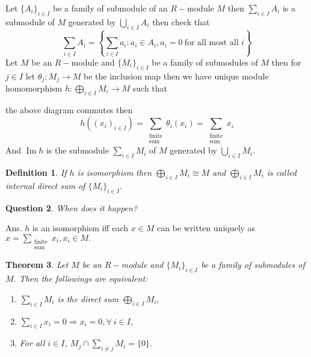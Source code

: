 \documentclass[11pt]{amsart}
\newtheorem{theorem}{Theorem}[section]
\newtheorem{defn}[theorem]{Definition}
\newtheorem{qns}[theorem]{Question}
\DeclareMathOperator{\im}{\text{Im}}
\begin{document}
 Let $\{A_i\}_{i\in I}$ be a family of submodule of an $R-$module $M$ then $\displaystyle\sum_{i\in I} A_i$ is a submodule of $M$ generated by $\displaystyle\bigcup_{i\in I} A_i$ then check that $$\displaystyle\sum_{i\in I} A_i=\left\lbrace\displaystyle\sum_{i\in I} a_i:a_i\in A_i,a_i=0~\text{for all most all~}i\right\rbrace$$
Let $M$ be an $R-$module and $\{M_i\}_{i\in I}$ be a family of submodules of $M$ then for $j\in I$ let $\theta_j:M_j\to M$ be the inclusion map then we have unique module homomorphism $h:\displaystyle\bigoplus_{i\in I} M_i\to M$ such that \begin{center}
\end{center}
the above diagram commutes then $$h((x_i)_{i\in I})=\displaystyle\sum_{\substack{\text{finite}\\ \text{sum}}} \theta_i(x_i)=\displaystyle\sum_{\substack{\text{finite}\\ \text{sum}}} x_i$$
And $\im h$ is the submodule $\displaystyle\sum_{i\in I} M_i$ of $M$ generated by $\displaystyle\bigcup_{i\in I} M_i.$
\begin{defn}
If $h$ is isomorphism then $\displaystyle\bigoplus_{i\in I} M_i \cong M$ and $\displaystyle\bigoplus_{i\in I} M_i$ is called internal direct sum of $\{M_i\}_{i\in I}.$
\end{defn}
\begin{qns}
When does it happen?
\end{qns}
Ans. $h$ is an isomorphism iff each $x\in M$ can be written uniquely as $x=\displaystyle\sum_{\substack{\text{finite}\\ \text{sum}}} x_i,x_i\in M.$
\begin{theorem}
Let $M$ be an $R-$module and $\{M_i\}_{i\in I}$ be a family of submodules of $M$. Then the followings are equivalent: \begin{enumerate}
\item $\displaystyle\sum_{i\in I} M_i$ is the direct sum $\displaystyle\bigoplus_{i\in I} M_i,$
\item $\displaystyle\sum_{i\in I} x_i=0 \Rightarrow x_i=0,\forall~i\in I,$ 
\item For all $i\in I$, $M_j\cap \displaystyle\sum_{i\neq j} M_i=\{0\}.$
\end{enumerate}
\end{theorem}
\end{document}
